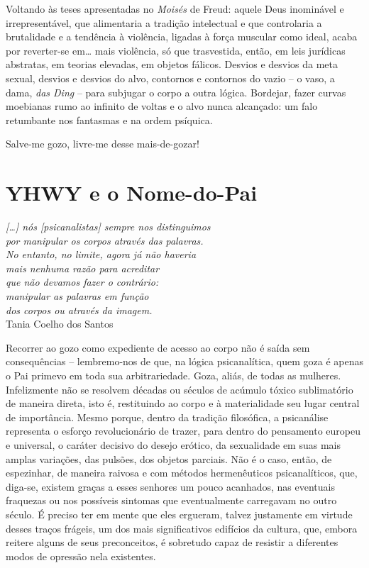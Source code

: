 Voltando às teses apresentadas no \emph{Moisés} de Freud: aquele Deus
inominável e irrepresentável, que alimentaria a tradição intelectual e
que controlaria a brutalidade e a tendência à violência, ligadas à força
muscular como ideal, acaba por reverter-se em\ldots{} mais violência, só que
trasvestida, então, em leis jurídicas abstratas, em teorias elevadas, em
objetos fálicos. Desvios e desvios da meta sexual, desvios e desvios do
alvo, contornos e contornos do vazio -- o vaso, a dama, \emph{das Ding}
-- para subjugar o corpo a outra lógica. Bordejar, fazer curvas
moebianas rumo ao infinito de voltas e o alvo nunca alcançado: um falo
retumbante nos fantasmas e na ordem psíquica.

Salve-me gozo, livre-me desse mais-de-gozar!

\section{YHWY e o Nome-do-Pai}

\begin{flushright}
\footnotesize
\emph{{[}\ldots{}{]} nós {[}psicanalistas{]} sempre nos distinguimos\\
por manipular os corpos através das palavras.\\
No entanto, no limite, agora já não haveria\\
mais nenhuma razão para acreditar \\
que não devamos fazer o contrário: \\
manipular as palavras em função \\
dos corpos ou através da imagem.}\\
Tania Coelho dos Santos
\end{flushright}

Recorrer ao gozo como expediente de acesso ao corpo não é saída sem
consequências -- lembremo-nos de que, na lógica psicanalítica, quem goza
é apenas o Pai primevo em toda sua arbitrariedade. Goza, aliás, de todas
as mulheres. Infelizmente não se resolvem décadas ou séculos de acúmulo
tóxico sublimatório de maneira direta, isto é, restituindo ao corpo e à
materialidade seu lugar central de importância. Mesmo porque, dentro da
tradição filosófica, a psicanálise representa o esforço revolucionário
de trazer, para dentro do pensamento europeu e universal, o caráter
decisivo do desejo erótico, da sexualidade em suas mais amplas
variações, das pulsões, dos objetos parciais. Não é o caso, então, de
espezinhar, de maneira raivosa e com métodos hermenêuticos
psicanalíticos, que, diga-se, existem graças a esses senhores um pouco
acanhados, nas eventuais fraquezas ou nos possíveis sintomas que
eventualmente carregavam no outro século. É preciso ter em mente que
eles ergueram, talvez justamente em virtude desses traços frágeis, um
dos mais significativos edifícios da cultura, que, embora reitere alguns
de seus preconceitos, é sobretudo capaz de resistir a diferentes modos
de opressão nela existentes.

